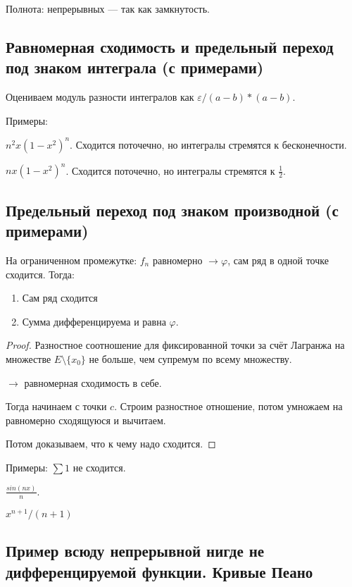 \documentclass[12pt, a4paper, oneside]{memoir}
\begin{document}
Полнота: непрерывных — так как замкнутость.

\subsection{Равномерная сходимость и предельный переход под знаком интеграла (с примерами)}

Оцениваем модуль разности интегралов как $\varepsilon/(a - b) * (a - b)$.

Примеры:

$n^2 x (1 - x^2)^n$. Сходится поточечно, но интегралы стремятся к бесконечности.

$n x (1 - x^2)^n$. Сходится поточечно, но интегралы стремятся к $\frac{1}{2}$.

\subsection{Предельный переход под знаком производной (с примерами)}

\begin{theorem}
    На ограниченном промежутке: $f_n$ равномерно $→ \varphi$, сам ряд в одной точке сходится.
    Тогда:

    \begin{enumerate}
        \item Сам ряд сходится
        \item Сумма дифференцируема и равна $\varphi$.
    \end{enumerate}

    \begin{proof}
        Разностное соотношение для фиксированной точки за счёт Лагранжа на множестве $E \setminus \{x_0\}$ не больше,
        чем супремум по всему множеству.

        $→$ равномерная сходимость в себе.

        Тогда начинаем с точки $c$. Строим разностное отношение, потом умножаем на равномерно сходящуюся и вычитаем.

        Потом доказываем, что к чему надо сходится.
    \end{proof}
\end{theorem}

Примеры: $\sum 1$ не сходится.

$\frac{sin(nx)}{n}$.

$x^{n + 1}/(n + 1)$


\subsection{Пример всюду непрерывной нигде не дифференцируемой функции. Кривые Пеано}
\end{document}

